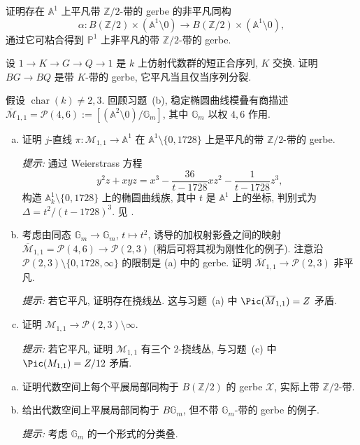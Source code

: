 \begin{exercise}\label{src:7.4.22}
证明存在 $\mathbb A^1$ 上平凡带 $\mathbb Z/2$-带的 gerbe 的非平凡同构
\[
\alpha:B(\mathbb Z/2)\times(\mathbb A^1\setminus0)\longrightarrow B(\mathbb Z/2)\times(\mathbb A^1\setminus0),
\]
通过它可粘合得到 $\mathbb P^1$ 上非平凡的带 $\mathbb Z/2$-带的 gerbe.
\end{exercise}
\begin{exercise}\label{src:7.4.23}
设 $1\to K\to G\to Q\to1$ 是 $k$ 上仿射代数群的短正合序列, $K$ 交换. 证明 $BG\to BQ$ 是带 $K$-带的 gerbe, 它平凡当且仅当序列分裂.
\end{exercise}
\begin{exercise}\label{src:7.4.24}
假设 $\operatorname{char}(k)\neq2,3$. 回顾习题~(b), 稳定椭圆曲线模叠有商描述 $\overline{\mathcal M}_{1,1}=\mathcal P(4,6):=[(\mathbb A^2\setminus0)/\mathbb G_m]$, 其中 $\mathbb G_m$ 以权 $4,6$ 作用.
\begin{enumerate}[(a)]
\item 证明 $j$-直线 $\pi:\mathcal M_{1,1}\to\mathbb A^1$ 在 $\mathbb A^1\setminus\{0,1728\}$ 上是平凡的带 $\mathbb Z/2$-带的 gerbe.

\textit{提示:} 通过 Weierstrass 方程
\[
y^2z+xyz=x^3-\frac{36}{t-1728}xz^2-\frac1{t-1728}z^3,
\]
构造 $\mathbb A_k^1\setminus\{0,1728\}$ 上的椭圆曲线族, 其中 $t$ 是 $\mathbb A^1$ 上的坐标, 判别式为 $\Delta=t^2/(t-1728)^3$. 见 \cite[命题 III.1.4(c)]{Sil09}.
\item 考虑由同态 $\mathbb G_m\to\mathbb G_m$, $t\mapsto t^2$, 诱导的加权射影叠之间的映射 $\overline{\mathcal M}_{1,1}=\mathcal P(4,6)\to\mathcal P(2,3)$ (稍后可将其视为刚性化的例子). 注意沿 $\mathcal P(2,3)\setminus\{0,1728,\infty\}$ 的限制是 (a) 中的 gerbe. 证明 $\overline{\mathcal M}_{1,1}\to\mathcal P(2,3)$ 非平凡.

\textit{提示:} 若它平凡, 证明存在挠线丛. 这与习题~(a) 中 $\Pic(\overline{\mathcal M}_{1,1})=\mathbb Z$ 矛盾.
\item 证明 $\mathcal M_{1,1}\to\mathcal P(2,3)\setminus\infty$.

\textit{提示:} 若它平凡, 证明 $\mathcal M_{1,1}$ 有三个 $2$-挠线丛, 与习题~(c) 中 $\Pic(\mathcal M_{1,1})=\mathbb Z/12$ 矛盾.
\end{enumerate}
\end{exercise}
\begin{exercise}\label{src:7.4.25}
\begin{enumerate}[(a)]
\item 证明代数空间上每个平展局部同构于 $B(\mathbb Z/2)$ 的 gerbe $\mathcal X$, 实际上带 $\mathbb Z/2$-带.
\item 给出代数空间上平展局部同构于 $B\mathbb G_m$, 但不带 $\mathbb G_m$-带的 gerbe 的例子.

\textit{提示:} 考虑 $\mathbb G_m$ 的一个形式的分类叠.
\end{enumerate}
\end{exercise}
